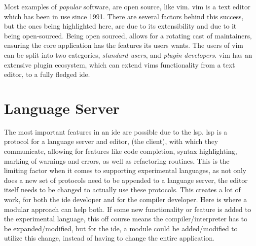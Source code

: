 Most examples of \textit{popular} software, are open source, like \gls{vim}.
\gls{vim} is a text editor which has been in use since 1991. There are several
factors behind this success, but the ones being highlighted here, are due to its
extensibility and due to it being open-sourced. Being open sourced, allows for a
rotating cast of maintainers, ensuring the core application has the features its
users wants. The users of \gls{vim} can be split into two categories,
\textit{standard users}, and \textit{plugin developers}. \gls{vim} has an
extensive plugin ecosystem, which can extend \gls{vim}s functionality from a
text editor, to a fully fledged \gls{ide}.

\section{Language Server}


The most important features in an \gls{ide} are possible due to the \gls{lsp}.
\gls{lsp} is a protocol for a language server and editor, (the client),
with which they communicate, allowing for features like code completion, syntax
highlighting, marking of warnings and errors, as well as refactoring routines.
This is the limiting factor when it comes to supporting experimental languages,
as not only does a new set of protocols need to be appended to a language server,
the editor itself needs to be changed to actually use these protocols. This
creates a lot of work, for both the \gls{ide} developer and for the compiler
developer. Here is where a modular approach can help both. If some new
functionality or feature is added to the experimental language, this off course
means the compiler/interpreter has to be expanded/modified, but for the
\gls{ide}, a module could be added/modified to utilize this change, instead of
having to change the entire application.
